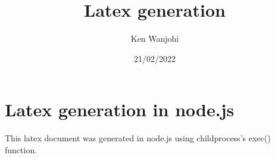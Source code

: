 \documentclass[a4paper, 11pt]{article}
\title{Latex generation }
\author{Ken Wanjohi}
\date{21/02/2022}
\begin{document}
    \maketitle
        \section{Latex generation in node.js}
        This latex document was generated in node.js using  childprocess's exec() function.
\end{document}

